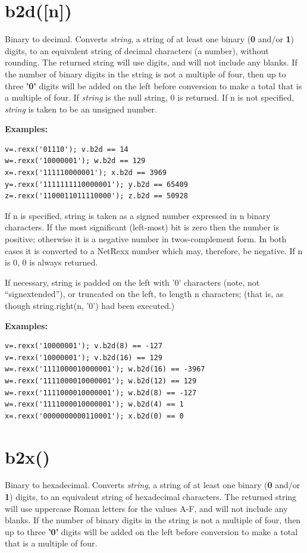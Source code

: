 \section{b2d([n{]})}\label{refb2x}
Binary to decimal.
Converts \emph{string}, a string of at least one binary
(\textbf{0} and/or \textbf{1}) digits, to an equivalent string of
decimal characters (a number), without rounding.
The returned string will use digits,
and will not include any blanks.
 If the number of binary digits in the string is not a multiple of four,
then up to three \textbf{'0'} digits will be added on the left before
conversion to make a total that is a multiple of four.
 If \emph{string} is the null string, 0 is returned. If n is not specified, \emph{string} is taken to be an unsigned number.

\textbf{Examples:}
\begin{lstlisting}
v=.rexx('01110'); v.b2d == 14 
w=.rexx('10000001'); w.b2d == 129 
x=.rexx('111110000001'); x.b2d == 3969 
y=.rexx('1111111110000001'); y.b2d == 65409 
z=.rexx('1100011011110000'); z.b2d == 50928 
\end{lstlisting}
If n is specified, string is taken as a signed number expressed in n binary characters. If the most significant (left-most) bit is zero then the number is positive; otherwise it is a negative number in twos-complement form. In both cases it is converted to a NetRexx number which may, therefore, be negative. If n is 0, 0 is always returned.

If necessary, string is padded on the left with '0' characters (note, not “signextended”), or truncated on the left, to length n characters; (that is, as though string.right(n, '0') had been executed.)

\textbf{Examples:}
\begin{lstlisting}
v=.rexx('10000001'); v.b2d(8) == -127 
v=.rexx('10000001'); v.b2d(16) == 129 
w=.rexx('1111000010000001'); w.b2d(16) == -3967 
w=.rexx('1111000010000001'); w.b2d(12) == 129 
w=.rexx('1111000010000001'); w.b2d(8) == -127 
w=.rexx('1111000010000001'); w.b2d(4) == 1 
x=.rexx('0000000000110001'); x.b2d(0) == 0
\end{lstlisting} 
\section{b2x()}\label{refb2x}
Binary to hexadecimal.
Converts \emph{string}, a string of at least one binary
(\textbf{0} and/or \textbf{1}) digits, to an equivalent string of
hexadecimal characters.
The returned string will use uppercase Roman letters for the values A-F,
and will not include any blanks.
 If the number of binary digits in the string is not a multiple of four,
then up to three \textbf{'0'} digits will be added on the left before
conversion to make a total that is a multiple of four.
 
